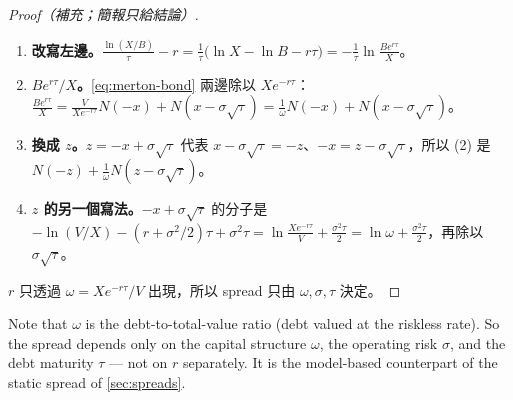 \suppstart
{}

\begin{proof}[Proof（補充；簡報只給結論）]
	\begin{enumerate}[(1),nosep]
		\item \textbf{改寫左邊。}$\frac{\ln(X/B)}{\tau}-r=\frac{1}{\tau}\bigl(\ln X-\ln B-r\tau\bigr)=-\frac1\tau\ln\frac{Be^{r\tau}}{X}$。
		\item \textbf{$Be^{r\tau}/X$。}\eqref{eq:merton-bond} 兩邊除以 $Xe^{-r\tau}$：$\frac{Be^{r\tau}}{X}=\frac{V}{Xe^{-r\tau}}N(-x)+N(x-\sigma\sqrt{\tau})=\frac{1}{\omega}N(-x)+N(x-\sigma\sqrt{\tau})$。
		\item \textbf{換成 $z$。}$z=-x+\sigma\sqrt{\tau}$ 代表 $x-\sigma\sqrt{\tau}=-z$、$-x=z-\sigma\sqrt{\tau}$，所以 (2) 是 $N(-z)+\frac1\omega N(z-\sigma\sqrt{\tau})$。
		\item \textbf{$z$ 的另一個寫法。}$-x+\sigma\sqrt{\tau}$ 的分子是 $-\ln(V/X)-(r+\sigma^{2}/2)\tau+\sigma^{2}\tau=\ln\frac{Xe^{-r\tau}}{V}+\frac{\sigma^{2}\tau}{2}=\ln\omega+\frac{\sigma^{2}\tau}{2}$，再除以 $\sigma\sqrt{\tau}$。
	\end{enumerate}
	$r$ 只透過 $\omega=Xe^{-r\tau}/V$ 出現，所以 spread 只由 $\omega,\sigma,\tau$ 決定。
\end{proof}
\suppend

Note that $\omega$ is the debt-to-total-value ratio (debt valued at the riskless rate).
\suppstart
So the spread depends only on the capital structure $\omega$, the operating risk $\sigma$, and the debt maturity $\tau$ --- not on $r$ separately.
It is the model-based counterpart of the static spread of \autoref{sec:spreads}.


